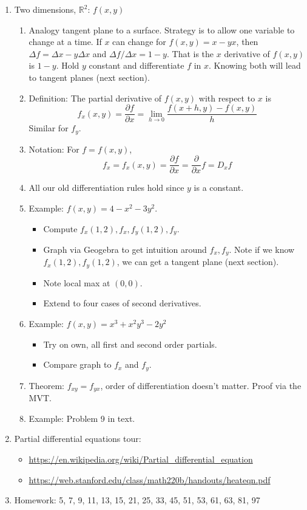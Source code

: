 \documentclass{article}
\begin{document}
\begin{enumerate}
\item Two dimensions, $\mathbb{R}^2$: $f(x,y)$
\begin{enumerate}
\item Analogy tangent plane to a surface. Strategy is to allow one variable to change at a time. If $x$ can change for $f(x,y)=x-yx$, then $\Delta f=\Delta x-y\Delta x$ and $\Delta f/\Delta x=1-y$. That is the $x$ derivative of $f(x,y)$ is $1-y$. Hold $y$ constant and differentiate $f$ in $x$. Knowing both will lead to tangent planes (next section).
\item Definition: The partial derivative of $f(x,y)$ with respect to $x$ is 
\[
f_x(x,y) = \frac{\partial f}{\partial x} = \lim_{h \rightarrow 0} \frac{f(x+h,y) - f(x,y)}{h}
\] Similar for $f_y$.
\item Notation: For $f=f(x,y)$,
\[
f_x = f_x(x,y) = \frac{\partial f}{\partial x} = \frac{\partial}{\partial x} f = D_x f
\]
\item All our old differentiation rules hold since $y$ is a constant.
\item Example: $f(x,y)=4-x^2-3y^2$. 
\begin{itemize}
\item Compute $f_x(1,2), f_x, f_y(1,2), f_y$. 
\item Graph via Geogebra to get intuition around $f_x, f_y$. Note if we know $f_x(1,2), f_y(1,2)$, we can get a tangent plane (next section).
\item Note local max at $(0,0)$.
\item Extend to four cases of second derivatives.
\end{itemize}
\item Example: $f(x,y)=x^3+x^2y^3-2y^2$
\begin{itemize}
\item Try on own, all first and second order partials.
\item Compare graph to $f_x$ and $f_y$.
\end{itemize} 
\item Theorem: $f_{xy}=f_{yx}$, order of differentiation doesn't matter. Proof via the MVT.
\item Example: Problem 9 in text.
\end{enumerate}

\item Partial differential equations tour:
\begin{itemize}
\item \url{https://en.wikipedia.org/wiki/Partial_differential_equation}
\item \url{https://web.stanford.edu/class/math220b/handouts/heateqn.pdf}
\end{itemize}

\item Homework: 5, 7, 9, 11, 13, 15, 21, 25, 33, 45, 51, 53, 61, 63, 81, 97

\end{enumerate}
\end{document}
